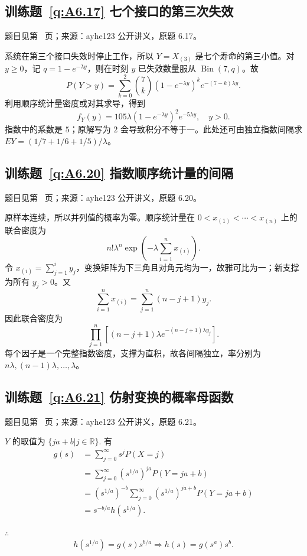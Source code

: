 \documentclass[UTF8,12pt,a4paper,fontset=fandol]{ctexbook}
\begin{document}
\subsection*{训练题~\ref{q:A6.17} 七个接口的第三次失效}\label{a:A6.17}{\small 题目见第~\pageref{q:A6.17} 页；来源：ayhe123 公开讲义，原题 6.17。}
\begin{solve}系统在第三个接口失效时停止工作，所以 $Y=X_{(3)}$ 是七个寿命的第三小值。对 $y\ge0$，记 $q=1-e^{-\lambda y}$，则在时刻 $y$ 已失效数量服从 $\operatorname{Bin}(7,q)$。故\[P(Y>y)=\sum_{k=0}^{2}\binom7k(1-e^{-\lambda y})^k e^{-(7-k)\lambda y}.\]利用顺序统计量密度或对其求导，得到\[f_Y(y)=105\lambda(1-e^{-\lambda y})^2e^{-5\lambda y},\quad y>0.\]指数中的系数是 $5$；原解写为 $2$ 会导致积分不等于一。此处还可由独立指数间隔求 $EY=(1/7+1/6+1/5)/\lambda$。\end{solve}

\subsection*{训练题~\ref{q:A6.20} 指数顺序统计量的间隔}\label{a:A6.20}{\small 题目见第~\pageref{q:A6.20} 页；来源：ayhe123 公开讲义，原题 6.20。}
\begin{solve}原样本连续，所以并列值的概率为零。顺序统计量在 $0<x_{(1)}<\cdots<x_{(n)}$ 上的联合密度为\[n!\lambda^n\exp\left(-\lambda\sum_{i=1}^nx_{(i)}\right).\]令 $x_{(i)}=\sum_{j=1}^iy_j$，变换矩阵为下三角且对角元均为一，故雅可比为一；新支撑为所有 $y_j>0$。又\[\sum_{i=1}^nx_{(i)}=\sum_{j=1}^n(n-j+1)y_j.\]因此联合密度为\[\prod_{j=1}^n\left[(n-j+1)\lambda e^{-(n-j+1)\lambda y_j}\right].\]每个因子是一个完整指数密度，支撑为直积，故各间隔独立，率分别为 $n\lambda,(n-1)\lambda,\ldots,\lambda$。\end{solve}

\subsection*{训练题~\ref{q:A6.21} 仿射变换的概率母函数}\label{a:A6.21}{\small 题目见第~\pageref{q:A6.21} 页；来源：ayhe123 公开讲义，原题 6.21。}
\begin{solve}
    $Y$ 的取值为 $\{ja+b|j\in\mathbb{R}\}$. 有
    \begin{align*}
        g(s) & =\sum\limits_{j=0}^\infty s^jP(X=j) \\
        & =\sum\limits_{j=0}^\infty(s^{1/a})^{ja}P(Y=ja+b) \\
        & =(s^{1/a})^{-b}\sum\limits_{j=0}^\infty(s^{1/a})^{ja+b}P(Y=ja+b) \\
        & =s^{-b/a}h(s^{1/a}).
    \end{align*}

    $\therefore$
    \[h(s^{1/a})=g(s)s^{b/a}\Rightarrow h(s)=g(s^a)s^b.\]
\end{solve}
\end{document}
